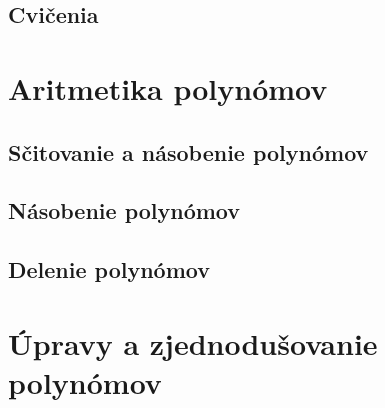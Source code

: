 \documentclass[12pt, twopage]{article}
\theoremstyle{definition}
\theoremstyle{definition}
\theoremstyle{definition}
\begin{document}
	\subsection{Cvičenia}
	
	\section{Aritmetika polynómov}
	
	\subsection{Sčitovanie a násobenie polynómov}
	
	\subsection{Násobenie polynómov}
	
	\subsection{Delenie polynómov}
	
	\section{Úpravy a zjednodušovanie polynómov}
\end{document}
